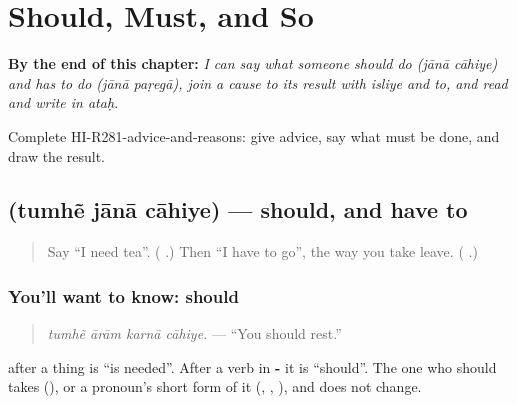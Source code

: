 
\chapter{Should, Must, and So}
\label{ch:hi-should-must-and-so}

\begin{chapteropening}
\textbf{By the end of this chapter:} \emph{I can say what someone should do (jānā cāhiye) and has to do (jānā paṛegā), join a cause to its result with isliye and to, and read and write  in ataḥ.}

Complete HI-R281-advice-and-reasons: give advice, say what must be done, and draw the result.
\end{chapteropening}

\section[\texorpdfstring{\hi{तुम्हें} \hi{जाना} \hi{चाहिए} (tumhẽ jānā cāhiye)}{तुम्हें जाना चाहिए (tumhẽ jānā cāhiye)}]{   (tumhẽ jānā cāhiye) — should, and have to}

\label{lesson:HI-C281-janachahiye}



\begin{quote}
Say \textquotedblleft{}I need tea\textquotedblright{}. (\textbf{  }.) Then \textquotedblleft{}I have to go\textquotedblright{}, the way you take leave. (\textbf{ }.)
\end{quote}

\subsection*{You'll want to know: should}
\begin{quote}
\textbf{   }
\end{quote}

\begin{quote}
\emph{tumhẽ ārām karnā cāhiye.} — \textquotedblleft{}You should rest.\textquotedblright{}
\end{quote}

\textbf{} after a thing is \textquotedblleft{}is needed\textquotedblright{}. After a verb in \textbf{-} it is \textquotedblleft{}should\textquotedblright{}. The one who should takes \textbf{} (\textbf{}), or a pronoun's short form of it (\textbf{}, \textbf{}, \textbf{}), and \textbf{} does not change.

